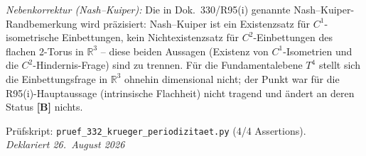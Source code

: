 \emph{Nebenkorrektur (Nash--Kuiper):} Die in Dok.~330/R95(i) genannte
Nash--Kuiper-Randbemerkung wird präzisiert: Nash--Kuiper ist ein
Existenzsatz für $C^1$-isometrische Einbettungen, kein Nichtexistenzsatz
für $C^2$-Einbettungen des flachen 2-Torus in $\mathbb{R}^3$ -- diese
beiden Aussagen (Existenz von $C^1$-Isometrien und die $C^2$-Hindernis-Frage)
sind zu trennen. Für die Fundamentalebene $T^4$ stellt sich die
Einbettungsfrage in $\mathbb{R}^3$ ohnehin dimensional nicht; der Punkt
war für die R95(i)-Hauptaussage (intrinsische Flachheit) nicht tragend
und ändert an deren Status \textbf{[B]} nichts.

Prüfskript: \texttt{pruef\_332\_krueger\_periodizitaet.py} (4/4 Assertions).\\
\emph{Deklariert 26.~August 2026}

\medskip
